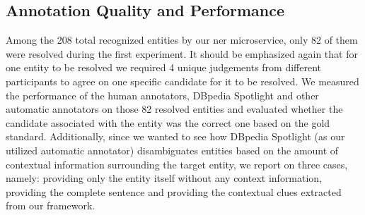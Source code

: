 \subsection{Annotation Quality and Performance}
Among the 208 total recognized entities by our \ac{ner} microservice, only 82 of them were resolved during the first experiment. It should be emphasized again that for one entity to be resolved we required 4 unique judgements from different participants to agree on one specific candidate for it to be resolved. We measured the performance of the human annotators, DBpedia Spotlight and other automatic annotators on those 82 resolved entities and evaluated whether the candidate associated with the entity was the correct one based on the gold standard. Additionally, since we wanted to see how DBpedia Spotlight (as our utilized automatic annotator) disambiguates entities based on the amount of contextual information surrounding the target entity, we report on three cases, namely: providing only the entity itself without any context information, providing the complete sentence and providing the contextual clues extracted from our framework. 
